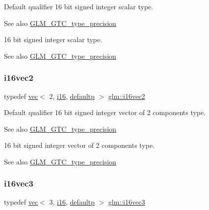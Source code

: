 Default qualifier 16 bit signed integer scalar type. \begin{DoxySeeAlso}{See also}
\hyperlink{group__gtc__type__precision}{G\+L\+M\+\_\+\+G\+T\+C\+\_\+type\+\_\+precision}
\end{DoxySeeAlso}
16 bit signed integer scalar type. \begin{DoxySeeAlso}{See also}
\hyperlink{group__gtc__type__precision}{G\+L\+M\+\_\+\+G\+T\+C\+\_\+type\+\_\+precision} 
\end{DoxySeeAlso}
\mbox{\label{group__gtc__type__precision_gad912fd04abb876a5b806118ec6e0f283}} 
\subsubsection{\texorpdfstring{i16vec2}{i16vec2}}
{\footnotesize\ttfamily typedef \hyperlink{structglm_1_1vec}{vec}$<$ 2, \hyperlink{group__gtc__type__precision_ga35e5542ca05b29cc256fdafb8503d1fd}{i16}, \hyperlink{namespaceglm_a36ed105b07c7746804d7fdc7cc90ff25a9d21ccd8b5a009ec7eb7677befc3bf51}{defaultp} $>$ \hyperlink{group__gtc__type__precision_gad912fd04abb876a5b806118ec6e0f283}{glm\+::i16vec2}}

Default qualifier 16 bit signed integer vector of 2 components type. \begin{DoxySeeAlso}{See also}
\hyperlink{group__gtc__type__precision}{G\+L\+M\+\_\+\+G\+T\+C\+\_\+type\+\_\+precision}
\end{DoxySeeAlso}
16 bit signed integer vector of 2 components type. \begin{DoxySeeAlso}{See also}
\hyperlink{group__gtc__type__precision}{G\+L\+M\+\_\+\+G\+T\+C\+\_\+type\+\_\+precision} 
\end{DoxySeeAlso}
\mbox{\label{group__gtc__type__precision_ga1f2b1dd6e4d9109be5f4433c8ff38cb8}} 
\subsubsection{\texorpdfstring{i16vec3}{i16vec3}}
{\footnotesize\ttfamily typedef \hyperlink{structglm_1_1vec}{vec}$<$ 3, \hyperlink{group__gtc__type__precision_ga35e5542ca05b29cc256fdafb8503d1fd}{i16}, \hyperlink{namespaceglm_a36ed105b07c7746804d7fdc7cc90ff25a9d21ccd8b5a009ec7eb7677befc3bf51}{defaultp} $>$ \hyperlink{group__gtc__type__precision_ga1f2b1dd6e4d9109be5f4433c8ff38cb8}{glm\+::i16vec3}}

